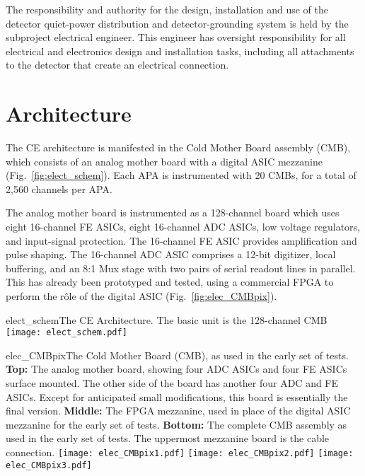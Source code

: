 The responsibility and authority for the design, installation 
and use of the detector quiet-power distribution and 
detector-grounding system is held by the subproject electrical engineer. 
This engineer has oversight responsibility for all electrical and electronics 
design and installation tasks, including all attachments to the detector 
that create an electrical connection. 

%
\section{Architecture}
\label{sec:fe_arch}

The CE architecture is manifested in the Cold Mother Board assembly (CMB),
which consists of an analog mother board with a digital ASIC mezzanine (Fig.~\ref{fig:elect_schem}).
Each APA is instrumented with 20 CMBs, for a total of 2,560 channels per APA.

The analog mother board is instrumented as a 128-channel board which uses eight 16-channel FE ASICs,
eight 16-channel ADC ASICs, low voltage regulators, and input-signal protection.
The 16-channel FE ASIC provides amplification and pulse shaping.
The 16-channel ADC ASIC comprises a 12-bit digitizer, local buffering,
and an 8:1 Mux stage with two pairs of serial readout lines in parallel.
This has already been prototyped and tested,
using a commercial FPGA to perform the r\^ole of the digital ASIC (Fig.~\ref{fig:elec_CMBpix}).

\begin{cdrfigure}{elect_schem}{The CE Architecture. The basic unit is the 128-channel CMB}
\texttt{[image: elect\_schem.pdf]}
\end{cdrfigure}

\begin{cdrfigure}{elec_CMBpix}{The Cold Mother Board (CMB), as used in the early set of tests.
  {\bf Top:} The analog mother board, showing four ADC ASICs and four FE ASICs surface mounted.
  The other side of the board has another four ADC and FE ASICs.
  Except for anticipated small modifications, this board is essentially the final version.
  {\bf Middle:} The FPGA mezzanine, used in place of the digital ASIC mezzanine for the early set of tests.
  {\bf Bottom:} The complete CMB assembly as used in the early set of tests.
  The uppermost mezzanine board is the cable connection.}
\texttt{[image: elec\_CMBpix1.pdf]}
\texttt{[image: elec\_CMBpix2.pdf]}
\texttt{[image: elec\_CMBpix3.pdf]}
\end{cdrfigure}

